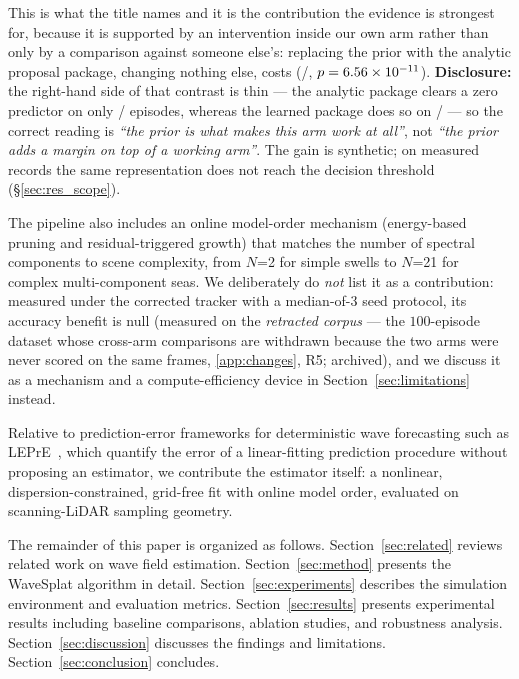 \documentclass[review]{elsarticle}
\begin{document}
\begin{enumerate}
    This is what the title names and it
    is the contribution the evidence is strongest for, because it is supported by an
    intervention inside our own arm rather than only by a comparison against
    someone else's: replacing the prior with the analytic proposal package, changing
    nothing else, costs \BTwentyTwoRel{}
    (\BTwentyTwoBetter{}/\BTwentyTwoN{}, $p = 6.56\times 10^{-11}{}$).
    \textbf{Disclosure:} the right-hand side of that contrast is thin --- the
    analytic package clears a zero predictor on only
    \BTwentyTwoAnaZero{}/\BTwentyTwoN{} episodes, whereas the learned package does
    so on \BTwentyTwoLearnZero{}/\BTwentyTwoN{} --- so the correct reading is
    \emph{``the prior is what makes this arm work at all''}, not \emph{``the prior
    adds a margin on top of a working arm''}. The gain is synthetic; on measured
    records the same representation does not reach the decision threshold
    (\S\ref{sec:res_scope}).
\end{enumerate}

The pipeline also includes an online model-order mechanism (energy-based
pruning and residual-triggered growth) that
matches the number of spectral components to scene complexity, from $N$=2 for
simple swells to $N$=21 for complex multi-component seas.  We deliberately do
\emph{not} list it as a contribution: measured under the corrected tracker with
a median-of-3 seed protocol, its accuracy benefit is null
(measured on the \emph{retracted corpus} --- the $100$-episode dataset whose
cross-arm comparisons are withdrawn because the two arms were never scored on the
same frames, \ref{app:changes}, R5; archived), and we discuss it as a mechanism and a
compute-efficiency device in Section~\ref{sec:limitations} instead.

Relative to prediction-error frameworks for deterministic wave forecasting such
as LEPrE~\citep{fucile2018}, which quantify the error of a linear-fitting
prediction procedure without proposing an estimator, we contribute the estimator
itself: a nonlinear, dispersion-constrained, grid-free fit with online model
order, evaluated on scanning-LiDAR sampling geometry.

The remainder of this paper is organized as follows.
Section~\ref{sec:related} reviews related work on wave field estimation.
Section~\ref{sec:method} presents the WaveSplat algorithm in detail.
Section~\ref{sec:experiments} describes the simulation environment and
evaluation metrics.
Section~\ref{sec:results} presents experimental results including
baseline comparisons, ablation studies, and robustness analysis.
Section~\ref{sec:discussion} discusses the findings and limitations.
Section~\ref{sec:conclusion} concludes.
\end{document}
